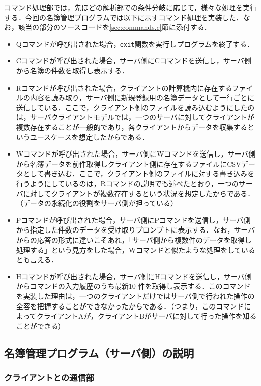 \documentclass[11pt]{jsarticle}
\begin{document}
コマンド処理部では，先ほどの解析部での条件分岐に応じて，様々な処理を実行する．今回の名簿管理プログラムでは以下に示すコマンド処理を実装した．なお，該当の部分のソースコードを\ref{sec:commands.c}節に添付する．

\begin{itemize}
      \item Qコマンドが呼び出された場合，{\tt exit}関数を実行しプログラムを終了する．
      \item Cコマンドが呼び出された場合，サーバ側にCコマンドを送信し，サーバ側から名簿の件数を取得し表示する．
      \item Rコマンドが呼び出された場合，クライアントの計算機内に存在するファイルの内容を読み取り，サーバ側に新規登録用の名簿データとして一行ごとに送信している．ここで，クライアント側のファイルを読み込むようにしたのは，サーバクライアントモデルでは，一つのサーバに対してクライアントが複数存在することが一般的であり，各クライアントからデータを収集するというユースケースを想定したからである．
      \item Wコマンドが呼び出された場合，サーバ側にWコマンドを送信し，サーバ側から名簿データを前件取得しクライアント側に存在するファイルにCSVデータとして書き込む．ここで，クライアント側のファイルに対する書き込みを行うようにしているのは，Rコマンドの説明でも述べたとおり，一つのサーバに対してクライアントが複数存在するという状況を想定したからである．（データの永続化の役割をサーバ側が担っている）
      \item Pコマンドが呼び出された場合，サーバ側にPコマンドを送信し，サーバ側から指定した件数のデータを受け取りプロンプトに表示する．なお，サーバからの応答の形式に違いこそあれ，「サーバ側から複数件のデータを取得し処理する」という見方をした場合，Wコマンドと似たような処理をしているとも言える．
      \item Hコマンドが呼び出された場合，サーバ側にHコマンドを送信し，サーバ側からコマンドの入力履歴のうち最新10
      件を取得し表示する．このコマンドを実装した理由は，一つのクライアントだけではサーバ側で行われた操作の全容を把握することができなかったからである．（つまり，このコマンドによってクライアントAが，クライアントBがサーバに対して行った操作を知ることができる）
\end{itemize}

\subsection{名簿管理プログラム（サーバ側）の説明}

\subsubsection{クライアントとの通信部}
\end{document}
